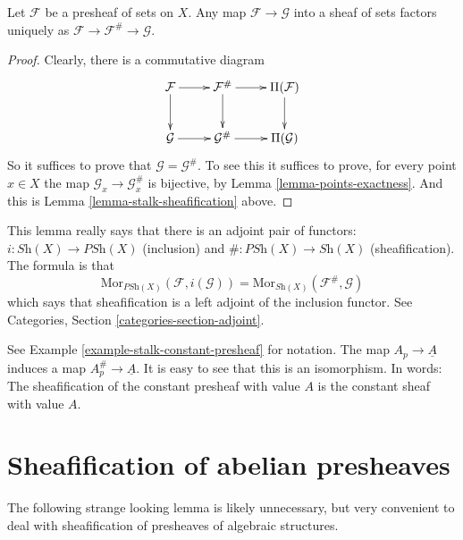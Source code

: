\begin{lemma}
\label{lemma-sheafifiy-universal}
Let $\mathcal{F}$ be a presheaf of sets on $X$.
Any map $\mathcal{F} \to \mathcal{G}$ into a sheaf of sets 
factors uniquely as
$\mathcal{F} \to \mathcal{F}^\# \to \mathcal{G}$.
\end{lemma}

\begin{proof}
Clearly, there is a commutative diagram
$$
\xymatrix{
\mathcal{F} \ar[r] \ar[d] &
\mathcal{F}^\# \ar[r] \ar[d] &
\Pi(\mathcal{F}) \ar[d] \\
\mathcal{G} \ar[r] &
\mathcal{G}^\# \ar[r] &
\Pi(\mathcal{G}) \\
}
$$
So it suffices to prove that $\mathcal{G} = \mathcal{G}^\#$.
To see this it suffices to prove, for every point $x \in X$ the
map $\mathcal{G}_x \to \mathcal{G}^\#_x$ is bijective, by
Lemma \ref{lemma-points-exactness}. And this is Lemma
\ref{lemma-stalk-sheafification} above.
\end{proof}

\noindent
This lemma really says that there is an adjoint pair
of functors: $i : \textit{Sh}(X) \to \textit{PSh}(X)$
(inclusion) and $\# : \textit{PSh}(X) \to \textit{Sh}(X)$
(sheafification). The formula is that
$$
\text{Mor}_{\textit{PSh}(X)}(\mathcal{F}, i(\mathcal{G}))
=
\text{Mor}_{\textit{Sh}(X)}(\mathcal{F}^\#, \mathcal{G})
$$
which says that sheafification is a left adjoint of
the inclusion functor. See Categories, Section
\ref{categories-section-adjoint}.

\begin{example}
\label{example-sheafify-constant}
See Example \ref{example-stalk-constant-presheaf} for notation.
The map $A_p \to \underline{A}$ induces a map
$A_p^\# \to \underline{A}$. It is easy to see that this
is an isomorphism. In words: The sheafification
of the constant presheaf with value $A$ is the
constant sheaf with value $A$.
\end{example}



\section{Sheafification of abelian presheaves}
\label{section-sheafify-abelian-presheaves}

\noindent
The following strange looking lemma is likely unnecessary, but
very convenient to deal with sheafification of presheaves
of algebraic structures.

